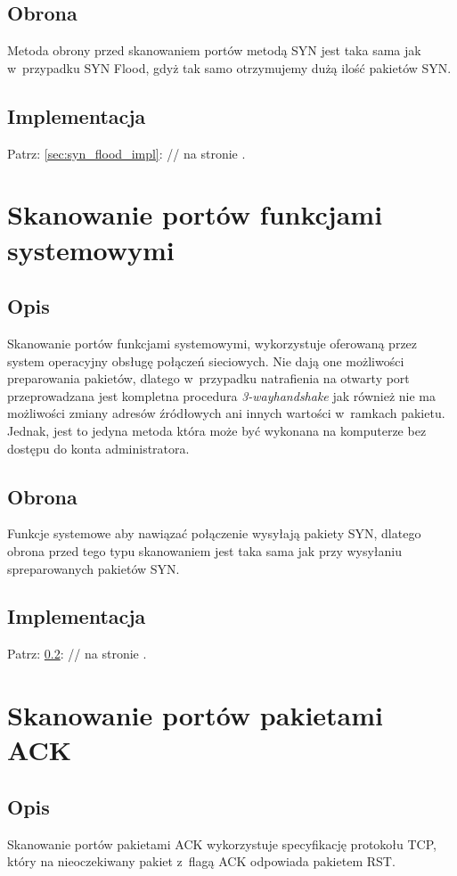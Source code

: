 \documentclass[a4paper,12pt]{book}
\begin{document}
		\subsection{Obrona}
			Metoda obrony przed skanowaniem portów metodą SYN jest taka sama jak w~przypadku SYN Flood, gdyż tak samo otrzymujemy dużą ilość pakietów SYN.
		\subsection{Implementacja}
			\label{sec:syn_scan_impl}
			Patrz: \ref{sec:syn_flood_impl}: // na stronie \pageref{sec:syn_flood_impl}.
	\section{Skanowanie portów funkcjami systemowymi}
		\subsection{Opis}
			Skanowanie portów funkcjami systemowymi, wykorzystuje oferowaną przez system operacyjny obsługę połączeń sieciowych.
			Nie dają one możliwości preparowania pakietów, dlatego w~przypadku natrafienia na otwarty port przeprowadzana jest kompletna procedura \textit{3-way\dywiz handshake} jak również nie ma możliwości zmiany adresów źródłowych ani innych wartości w~ramkach pakietu.
			Jednak, jest to jedyna metoda która może być wykonana na komputerze bez dostępu do konta administratora.
		\subsection{Obrona}
			Funkcje systemowe aby nawiązać połączenie wysyłają pakiety SYN, dlatego obrona przed tego typu skanowaniem jest taka sama jak przy wysyłaniu spreparowanych pakietów SYN.
		\subsection{Implementacja}
			Patrz: \ref{sec:syn_scan_impl}: // na stronie \pageref{sec:syn_scan_impl}.
	\section{Skanowanie portów pakietami ACK}
		\subsection{Opis}
			Skanowanie portów pakietami ACK wykorzystuje specyfikację protokołu TCP, który na nieoczekiwany pakiet z~flagą ACK odpowiada pakietem RST.
\end{document}

